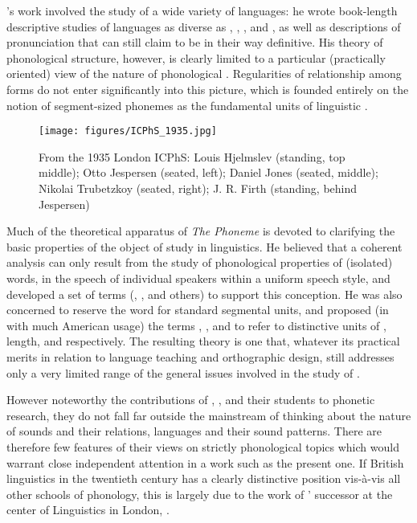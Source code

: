 {\Jones}'s work involved the study of a wide variety of languages: he
wrote book-length descriptive studies of languages as diverse as
 \citep{jones12:cantonese}, 
\citep{jones16:sechuana},  \citep{jones19:sinhala}, and
 \citep{jones23:russian}, as well as descriptions of 
pronunciation that can still claim to be in their way definitive. His
theory of phonological structure, however, is clearly limited to a
particular (practically oriented) view of the nature of phonological
. Regularities of relationship among forms do not enter
significantly into this picture, which is founded entirely on the
notion of segment-sized phonemes as the fundamental units of
linguistic .


\begin{wrapfigure}{r}{.5\textwidth}
  \texttt{[image: figures/ICPhS\_1935.jpg]}
  \caption{From the 1935 London ICPhS: Louis Hjelmslev (standing, top
    middle); Otto Jespersen (seated, left); Daniel Jones (seated,
    middle); Nikolai Trubetzkoy (seated, right); J. R. Firth (standing, behind
    Jespersen)}
  \label{fig:ch.firth.icphs_1935}
\end{wrapfigure}
Much of the theoretical apparatus of 
\textsl{The Phoneme} is devoted to clarifying the basic properties of
the object of study in linguistics. He believed that a coherent
analysis can only result from the study of phonological properties of
(isolated) words, in the speech of individual speakers within a
uniform speech style, and developed a set of terms (\emph{},
\emph{}, and others) to support this conception. 
He was also
concerned to reserve the word \emph{} for standard segmental
units, and proposed (in  with much American usage) the terms
\emph{}, \emph{}, and \emph{} to refer to
distinctive units of , length, and  respectively. The
resulting theory is one that, whatever its practical merits in
relation to language teaching and orthographic design, still addresses
only a very limited range of the general issues involved in the study
of .

However noteworthy the contributions of {\Sweet}, {\Jones}, and their
students to phonetic research, they do not fall far outside the
mainstream of thinking about the nature of sounds and their relations,
languages and their sound patterns. There are therefore few features
of their views on strictly phonological topics which would warrant
close independent attention in a work such as the present one. If
British linguistics in the twentieth century has a clearly distinctive
position vis-à-vis all other schools of phonology, this is largely due
to the work of {\Jones}' successor at the center of Linguistics in
London, .

